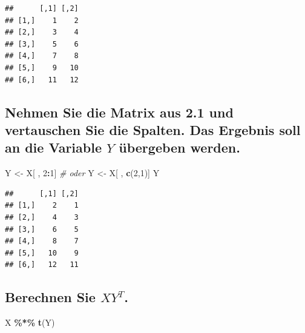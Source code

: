 \documentclass[12pt,a4paper]{article}
\newenvironment{Shaded}{\begin{snugshade}}{\end{snugshade}}
\newcommand{\CommentTok}[1]{\textcolor[rgb]{0.56,0.35,0.01}{\textit{#1}}}
\newcommand{\DecValTok}[1]{\textcolor[rgb]{0.00,0.00,0.81}{#1}}
\newcommand{\FunctionTok}[1]{\textcolor[rgb]{0.13,0.29,0.53}{\textbf{#1}}}
\newcommand{\NormalTok}[1]{#1}
\newcommand{\OtherTok}[1]{\textcolor[rgb]{0.56,0.35,0.01}{#1}}
\newcommand{\SpecialCharTok}[1]{\textcolor[rgb]{0.81,0.36,0.00}{\textbf{#1}}}
\begin{document}
\begin{verbatim}
##      [,1] [,2]
## [1,]    1    2
## [2,]    3    4
## [3,]    5    6
## [4,]    7    8
## [5,]    9   10
## [6,]   11   12
\end{verbatim}

\vspace{0.5cm}

\hypertarget{nehmen-sie-die-matrix-aus-2.1-und-vertauschen-sie-die-spalten.-das-ergebnis-soll-an-die-variable-y-uxfcbergeben-werden.}{%
\subsection{\texorpdfstring{Nehmen Sie die Matrix aus 2.1 und
vertauschen Sie die Spalten. Das Ergebnis soll an die Variable \(Y\)
übergeben
werden.}{Nehmen Sie die Matrix aus 2.1 und vertauschen Sie die Spalten. Das Ergebnis soll an die Variable Y übergeben werden.}}\label{nehmen-sie-die-matrix-aus-2.1-und-vertauschen-sie-die-spalten.-das-ergebnis-soll-an-die-variable-y-uxfcbergeben-werden.}}

\begin{Shaded}
\begin{Highlighting}[]
\NormalTok{    Y }\OtherTok{\textless{}{-}}\NormalTok{ X[ , }\DecValTok{2}\SpecialCharTok{:}\DecValTok{1}\NormalTok{] }\CommentTok{\# oder}
\NormalTok{    Y }\OtherTok{\textless{}{-}}\NormalTok{ X[ , }\FunctionTok{c}\NormalTok{(}\DecValTok{2}\NormalTok{,}\DecValTok{1}\NormalTok{)]}
\NormalTok{    Y}
\end{Highlighting}
\end{Shaded}

\begin{verbatim}
##      [,1] [,2]
## [1,]    2    1
## [2,]    4    3
## [3,]    6    5
## [4,]    8    7
## [5,]   10    9
## [6,]   12   11
\end{verbatim}

\vspace{0.5cm}

\hypertarget{berechnen-sie-xyt.}{%
\subsection{\texorpdfstring{Berechnen Sie
\(XY^{T}\).}{Berechnen Sie XY\^{}\{T\}.}}\label{berechnen-sie-xyt.}}

\begin{Shaded}
\begin{Highlighting}[]
\NormalTok{    X }\SpecialCharTok{\%*\%} \FunctionTok{t}\NormalTok{(Y)}
\end{Highlighting}
\end{Shaded}
\end{document}
